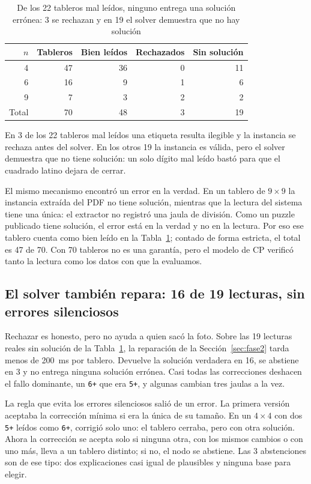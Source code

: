 \documentclass[conference]{IEEEtran}
\begin{document}
\begin{table}[t]
\caption{De los 22 tableros mal leídos, ninguno entrega una solución errónea: 3 se rechazan y en 19 el solver demuestra que no hay solución}
\label{tab:e2e}
\centering
\begin{tabular}{rrrrr}
\toprule
$n$ & Tableros & Bien leídos & Rechazados & Sin solución \\
\midrule
4 & 47 & 36 & 0 & 11 \\
6 & 16 & 9 & 1 & 6 \\
9 & 7 & 3 & 2 & 2 \\
\midrule
Total & 70 & 48 & 3 & 19 \\
\bottomrule
\end{tabular}
\end{table}

En 3 de los 22 tableros mal leídos una etiqueta resulta ilegible y la instancia se rechaza antes del solver. En los otros 19 la instancia es válida, pero el solver demuestra que no tiene solución: un solo dígito mal leído bastó para que el cuadrado latino dejara de cerrar.

El mismo mecanismo encontró un error en la verdad. En un tablero de $9 \times 9$ la instancia extraída del PDF no tiene solución, mientras que la lectura del sistema tiene una única: el extractor no registró una jaula de división. Como un puzzle publicado tiene solución, el error está en la verdad y no en la lectura. Por eso ese tablero cuenta como bien leído en la Tabla~\ref{tab:e2e}; contado de forma estricta, el total es 47 de 70. Con 70 tableros no es una garantía, pero el modelo de CP verificó tanto la lectura como los datos con que la evaluamos.

\subsection{El solver también repara: 16 de 19 lecturas, sin errores silenciosos}\label{sec:reparacion}
Rechazar es honesto, pero no ayuda a quien sacó la foto. Sobre las 19 lecturas reales sin solución de la Tabla~\ref{tab:e2e}, la reparación de la Sección~\ref{sec:fase2} tarda menos de 200~ms por tablero. Devuelve la solución verdadera en 16, se abstiene en 3 y no entrega ninguna solución errónea. Casi todas las correcciones deshacen el fallo dominante, un \texttt{6+} que era \texttt{5+}, y algunas cambian tres jaulas a la vez.

La regla que evita los errores silenciosos salió de un error. La primera versión aceptaba la corrección mínima si era la única de su tamaño. En un $4 \times 4$ con dos \texttt{5+} leídos como \texttt{6+}, corrigió solo uno: el tablero cerraba, pero con otra solución. Ahora la corrección se acepta solo si ninguna otra, con los mismos cambios o con uno más, lleva a un tablero distinto; si no, el nodo se abstiene. Las 3 abstenciones son de ese tipo: dos explicaciones casi igual de plausibles y ninguna base para elegir.
\end{document}
